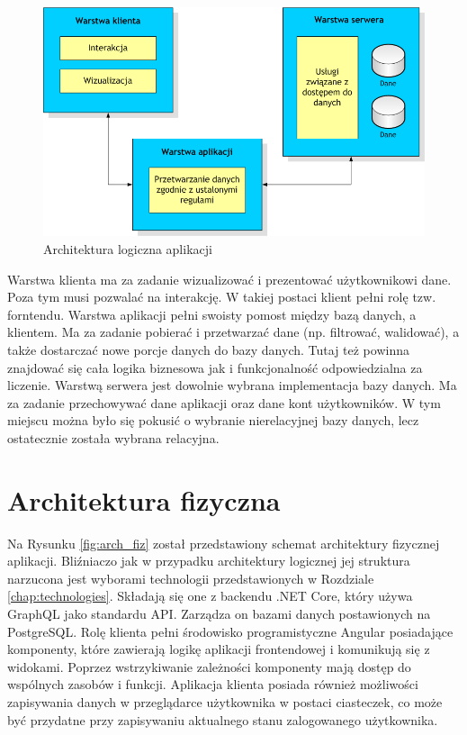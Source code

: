 \begin{figure}[H]
\includegraphics[width=\textwidth]{rys/arch-logiczna.png}
\caption{Architektura logiczna aplikacji}
\label{fig:arch_log}
\end{figure}

Warstwa klienta ma za zadanie wizualizować i prezentować użytkownikowi dane. Poza tym musi pozwalać na interakcję. W takiej postaci klient pełni rolę tzw. forntendu.\newline
Warstwa aplikacji pełni swoisty pomost między bazą danych, a klientem. Ma za zadanie pobierać i przetwarzać dane (np. filtrować, walidować), a także dostarczać nowe porcje danych do bazy danych. Tutaj też powinna znajdować się cała logika biznesowa jak i funkcjonalność odpowiedzialna za liczenie. \newline
Warstwą serwera jest dowolnie wybrana implementacja bazy danych. Ma za zadanie przechowywać dane aplikacji oraz dane kont użytkowników. W tym miejscu można było się pokusić o wybranie nierelacyjnej bazy danych, lecz ostatecznie została wybrana relacyjna.

\section{Architektura fizyczna}
\label{chap:arch_fiz}
Na Rysunku \ref{fig:arch_fiz} został przedstawiony schemat architektury fizycznej aplikacji. Bliźniaczo jak w przypadku architektury logicznej jej struktura narzucona jest wyborami technologii przedstawionych w Rozdziale \ref{chap:technologies}. Składają się one z backendu .NET Core, który używa GraphQL jako standardu API. Zarządza on bazami danych postawionych na PostgreSQL. Rolę klienta pełni środowisko programistyczne Angular posiadające komponenty, które zawierają logikę aplikacji frontendowej i komunikują się z widokami. Poprzez wstrzykiwanie zależności komponenty mają dostęp do wspólnych zasobów i funkcji. Aplikacja klienta posiada również możliwości zapisywania danych w przeglądarce użytkownika w postaci ciasteczek, co może być przydatne przy zapisywaniu aktualnego stanu zalogowanego użytkownika.


